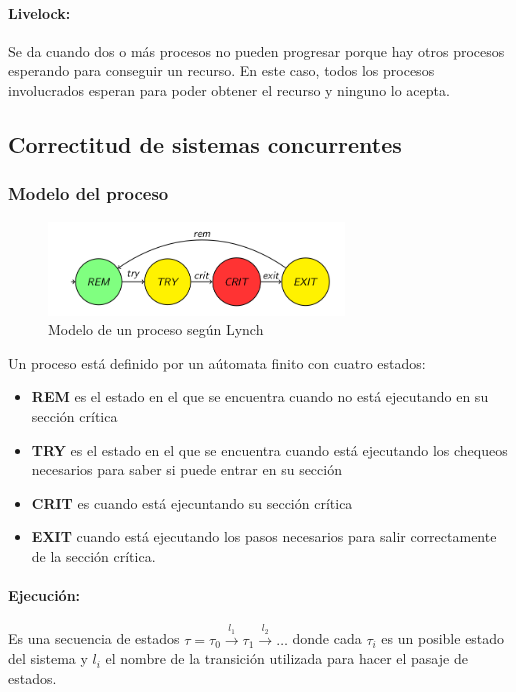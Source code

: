 \paragraph{Livelock:} Se da cuando dos o más procesos no pueden progresar porque hay otros procesos esperando para conseguir un recurso. En este caso, todos los procesos involucrados esperan para poder obtener el recurso y ninguno lo acepta.

\subsection{Correctitud de sistemas concurrentes}
\subsubsection{Modelo del proceso}

\begin{figure}[H]
	\centering
	\includegraphics[width=0.7\textwidth]{imagenes/modelo_proceso}
	\caption{Modelo de un proceso según Lynch}
	\label{fig:modeloproceso}
\end{figure}

Un proceso está definido por un aútomata finito con cuatro estados:
\begin{itemize}
	\item \textbf{REM} es el estado en el que se encuentra cuando no está ejecutando en su sección crítica
	\item \textbf{TRY} es el estado en el que se encuentra  cuando está ejecutando los chequeos necesarios para saber si puede entrar en su sección
	\item \textbf{CRIT} es cuando está ejecuntando su sección crítica
	\item \textbf{EXIT} cuando está ejecutando los pasos necesarios para salir correctamente de la sección crítica.
\end{itemize}

\paragraph{Ejecución:} Es una secuencia de estados $\tau = \tau_0 \overset{l_1}{\rightarrow} \tau_1 \overset{l_2}{\rightarrow}\dots$ donde cada $\tau_i$ es un posible estado del sistema y $l_i$ el nombre de la transición utilizada para hacer el pasaje de estados.

